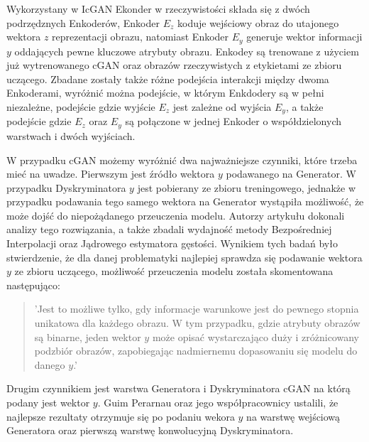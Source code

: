     Wykorzystany w IcGAN Ekonder w rzeczywistości składa się z dwóch podrzędznych
    Enkoderów, Enkoder $E_{z}$ koduje wejściowy obraz do utajonego wektora $z$ reprezentacji
    obrazu, natomiast Enkoder $E_{y}$ generuje wektor informacji $y$ oddających
    pewne kluczowe atrybuty obrazu. Enkodey są trenowane z użyciem już wytrenowanego
    cGAN oraz obrazów rzeczywistych z etykietami ze zbioru uczącego. Zbadane
    zostały także różne podejścia interakcji między dwoma Enkoderami, wyróżnić
    można podejście, w którym Enkdodery są w pełni niezależne, podejście
    gdzie wyjście $E_{z}$ jest zależne od wyjścia $E_{y}$, a także podejście
    gdzie $E_{z}$ oraz $E_{y}$ są połączone w jednej Enkoder o współdzielonych
    warstwach i dwóch wyjściach.

    W przypadku cGAN możemy wyróżnić dwa najważniejsze czynniki, które trzeba
    mieć na uwadze. Pierwszym jest źródło wektora $y$ podawanego na
    Generator. W przypadku Dyskryminatora $y$ jest pobierany ze
    zbioru treningowego, jednakże w przypadku podawania tego
    samego wektora na Generator wystąpiła możliwość, że może dojść do niepożądanego
    przeuczenia modelu. Autorzy artykułu dokonali analizy tego rozwiązania,
    a także zbadali wydajność metody Bezpośredniej Interpolacji oraz
    Jądrowego estymatora gęstości. Wynikiem tych badań było stwierdzenie, że
    dla danej problematyki najlepiej sprawdza się podawanie wektora $y$ ze zbioru
    uczącego, możliwość przeuczenia modelu została skomentowana następująco:
    \begin{quote}
      'Jest to możliwe tylko, gdy informacje warunkowe jest do pewnego stopnia
      unikatowa dla każdego obrazu. W tym przypadku, gdzie atrybuty obrazów są
      binarne, jeden wektor $y$ może opisać wystarczająco duży i zróżnicowany
      podzbiór obrazów, zapobiegając nadmiernemu dopasowaniu się modelu do
      danego $y$.'
    \end{quote}
    Drugim czynnikiem jest warstwa Generatora i Dyskryminatora cGAN na
    którą podany jest wektor $y$. Guim Perarnau oraz jego współpracownicy ustalili, że najlepsze rezultaty otrzymuje się po podaniu wekora $y$ na warstwę wejściową
    Generatora oraz pierwszą warstwę konwolucyjną Dyskryminatora.

